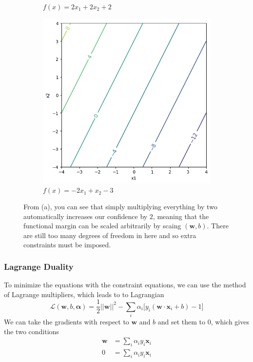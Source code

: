 \documentclass{article}
\begin{document}
\begin{figure}[H]
\begin{subfigure}[b]{0.32\textwidth}
        \caption{$f(x) = 2 x_1 + 2 x_2 + 2$} 
        \label{fig:two_times_scaled}
      \end{subfigure} 
      \hfill
      \begin{subfigure}[b]{0.32\textwidth} 
        \centering 
        \includegraphics[width=\textwidth]{img/scaling3.png} 
        \caption{$f(x) = -2x_1 + x_2 - 3$} 
        \label{fig:something_else}
      \end{subfigure} 
      \caption{From (a), you can see that simply multiplying everything by two automatically increases our confidence by $2$, meaning that the functional margin can be scaled arbitrarily by scaing $(\mathbf{w}, b)$. There are still too many degrees of freedom in here and so extra constraints must be imposed. } 
      \label{fig:scaling_problem} 
    \end{figure}

    \subsubsection{Lagrange Duality} 

      To minimize the equations with the constraint equations, we can use the method of Lagrange multipliers, which leads to to Lagrangian 
      \[\mathcal{L}(\mathbf{w}, b, \boldsymbol{\alpha}) = \frac{1}{2} ||\mathbf{w}||^2 - \sum_i \alpha_i \big[ y_i (\mathbf{w} \cdot \mathbf{x}_i + b) - 1\big]\]
      We can take the gradients with respect to $\mathbf{w}$ and $b$ and set them to $0$, which gives the two conditions 
      \begin{align*} 
        \mathbf{w} & = \sum_i \alpha_i y_i \mathbf{x}_i \\
        0 & = \sum_i \alpha_i y_i \mathbf{x}_i 
      \end{align*}
\end{document}

